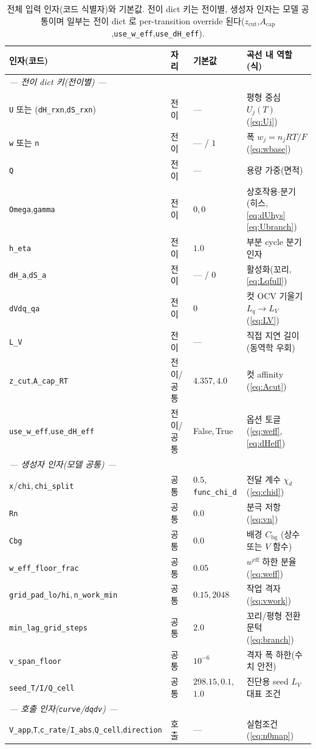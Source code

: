 \documentclass[11pt,a4paper]{article}
\newcommand{\eff}{\mathrm{eff}}
\newcommand{\bg}{\mathrm{bg}}
\newcommand{\code}[1]{\texttt{#1}}
\begin{document}
\begin{table}[t]
\centering\footnotesize
\renewcommand{\arraystretch}{1.18}
\caption{전체 입력 인자(코드 식별자)와 기본값. 전이 dict 키는 전이별, 생성자 인자는 모델 공통이며 일부는 전이 dict 로
per-transition override 된다($z_\mathrm{cut}$,$A_\mathrm{cap}$,\code{use\_w\_eff},\code{use\_dH\_eff}).}
\label{tab:inputs}
\begin{tabular}{l l l l}
\toprule
인자(코드) & 자리 & 기본값 & 곡선 내 역할(식) \\
\midrule
\multicolumn{4}{l}{\emph{— 전이 dict 키(전이별) —}}\\
\code{U} 또는 (\code{dH\_rxn},\code{dS\_rxn}) & 전이 & --- & 평형 중심 $U_j(T)$ (\eqref{eq:Uj}) \\
\code{w} 또는 \code{n} & 전이 & --- / $1$ & 폭 $w_j=n_jRT/F$ (\eqref{eq:wbase}) \\
\code{Q} & 전이 & --- & 용량 가중(면적) \\
\code{Omega},\code{gamma} & 전이 & $0$,\,$0$ & 상호작용$\cdot$분기(히스, \eqref{eq:dUhys}\eqref{eq:Ubranch}) \\
\code{h\_eta} & 전이 & $1.0$ & 부분 cycle 분기 인자 \\
\code{dH\_a},\code{dS\_a} & 전이 & --- / $0$ & 활성화(꼬리, \eqref{eq:Lqfull}) \\
\code{dVdq\_qa} & 전이 & $0$ & 컷 OCV 기울기 $L_q\!\to\!L_V$ (\eqref{eq:LV}) \\
\code{L\_V} & 전이 & --- & 직접 지연 길이(동역학 우회) \\
\code{z\_cut},\code{A\_cap\_RT} & 전이/공통 & $4.357$,\,$4.0$ & 컷 affinity (\eqref{eq:Acut}) \\
\code{use\_w\_eff},\code{use\_dH\_eff} & 전이/공통 & False,\,True & 옵션 토글(\eqref{eq:weff},\eqref{eq:dHeff}) \\
\multicolumn{4}{l}{\emph{— 생성자 인자(모델 공통) —}}\\
\code{x}/\code{chi},\,\code{chi\_split} & 공통 & $0.5$,\,\code{func\_chi\_d} & 전달 계수 $\chi_d$ (\eqref{eq:chid}) \\
\code{Rn} & 공통 & $0.0$ & 분극 저항 (\eqref{eq:vn}) \\
\code{Cbg} & 공통 & $0.0$ & 배경 $C_\bg$ (상수 또는 $V$ 함수) \\
\code{w\_eff\_floor\_frac} & 공통 & $0.05$ & $w^\eff$ 하한 분율 (\eqref{eq:weff}) \\
\code{grid\_pad\_lo/hi},\,\code{n\_work\_min} & 공통 & $0.15$,\,$2048$ & 작업 격자 (\eqref{eq:vwork}) \\
\code{min\_lag\_grid\_steps} & 공통 & $2.0$ & 꼬리/평형 전환 문턱 (\eqref{eq:branch}) \\
\code{v\_span\_floor} & 공통 & $10^{-6}$ & 격자 폭 하한(수치 안전) \\
\code{seed\_T/I/Q\_cell} & 공통 & $298.15$,\,$0.1$,\,$1.0$ & 진단용 seed $L_V$ 대표 조건 \\
\multicolumn{4}{l}{\emph{— 호출 인자(\code{curve}/\code{dqdv}) —}}\\
\code{V\_app},\code{T},\code{c\_rate}/\code{I\_abs},\code{Q\_cell},\code{direction} & 호출 & --- & 실험조건 (\eqref{eq:n0map}) \\
\bottomrule
\end{tabular}
\end{table}
\end{document}
